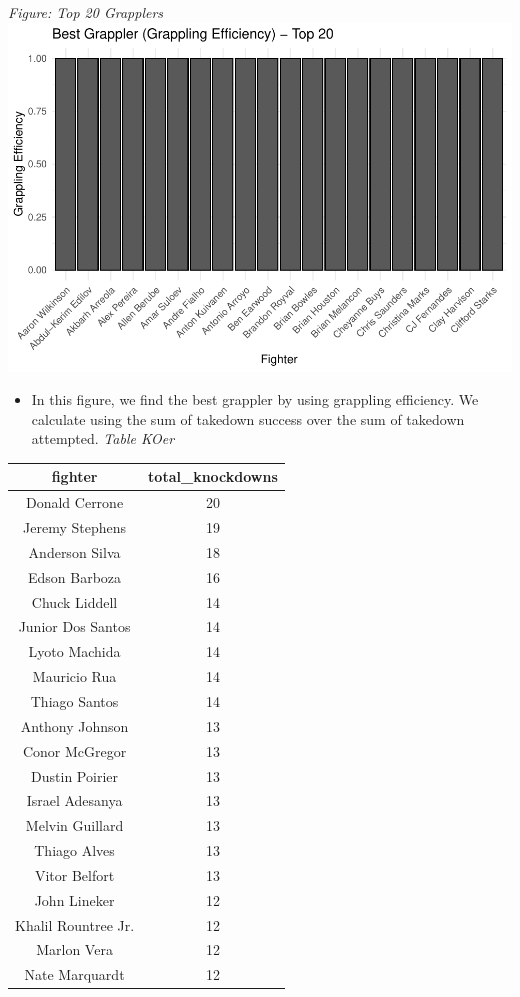 \documentclass[
  man,floatsintext]{apa6}
\providecommand{\tightlist}{%
  \setlength{\itemsep}{0pt}\setlength{\parskip}{0pt}}
\begin{document}
\emph{Figure: Top 20 Grapplers}
\includegraphics{Into-the-UFC_files/figure-latex/unnamed-chunk-6-1.pdf}

\begin{itemize}
\tightlist
\item
  In this figure, we find the best grappler by using grappling efficiency. We calculate using the sum of takedown success over the sum of takedown attempted.
  \emph{Table KOer}
\end{itemize}

\begin{tabular}{c|c}
\hline
fighter & total\_knockdowns\\
\hline
Donald Cerrone & 20\\
\hline
Jeremy Stephens & 19\\
\hline
Anderson Silva & 18\\
\hline
Edson Barboza & 16\\
\hline
Chuck Liddell & 14\\
\hline
Junior Dos Santos & 14\\
\hline
Lyoto Machida & 14\\
\hline
Mauricio Rua & 14\\
\hline
Thiago Santos & 14\\
\hline
Anthony Johnson & 13\\
\hline
Conor McGregor & 13\\
\hline
Dustin Poirier & 13\\
\hline
Israel Adesanya & 13\\
\hline
Melvin Guillard & 13\\
\hline
Thiago Alves & 13\\
\hline
Vitor Belfort & 13\\
\hline
John Lineker & 12\\
\hline
Khalil Rountree Jr. & 12\\
\hline
Marlon Vera & 12\\
\hline
Nate Marquardt & 12\\
\hline
\end{tabular}
\end{document}
